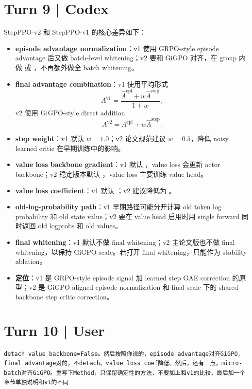 \documentclass[10pt]{ctexart}
\begin{document}
\section*{Turn 9 | Codex}
StepPPO-v2 和 StepPPO-v1 的核心差异如下：
\begin{itemize}
\item \textbf{episode advantage normalization}：v1 使用 GRPO-style episode advantage 后又做 batch-level whitening；v2 要和 GiGPO 对齐，在  group 内做  或 ，不再额外做全 batch whitening。
\item \textbf{final advantage combination}：v1 使用平均形式
\[
A^{\mathrm{v1}}=\frac{\widehat A^{\mathrm{epi}}+w\widehat A^{\mathrm{step}}}{1+w},
\]
v2 使用 GiGPO-style direct addition
\[
A^{\mathrm{v2}}=A^{\mathrm{epi}}+w\widehat A^{\mathrm{step}}.
\]
\item \textbf{step weight}：v1 默认 $w=1.0$；v2 论文规范建议 $w=0.5$，降低 noisy learned critic 在早期训练中的影响。
\item \textbf{value loss backbone gradient}：v1 默认 ，value loss 会更新 actor backbone；v2 稳定版本默认 ，value loss 主要训练 value head。
\item \textbf{value loss coefficient}：v1 默认 ；v2 建议降低为 。
\item \textbf{old-log-probability path}：v1 早期路径可能分开计算 old token log probability 和 old state value；v2 要在 value head 启用时用 single forward 同时返回 old logprobs 和 old values。
\item \textbf{final whitening}：v1 默认不做 final whitening；v2 主论文版也不做 final whitening，以保持 GiGPO scale。若打开 final whitening，只能作为 stability ablation。
\item \textbf{定位}：v1 是 GRPO-style episode signal 加 learned step GAE correction 的原型；v2 是 GiGPO-aligned episode normalization 和 final scale 下的 shared-backbone step critic correction。
\end{itemize}

\section*{Turn 10 | User}
\begin{Verbatim}[breaklines=true,breakanywhere=true]
detach_value_backbone=False。然后按照你说的，episode advantage对齐GiGPO，final advantage对的。不detach。value loss coef降低。然后，还有一点，micro-batch对齐GiGPO。重写下Method，只保留确定性的方法，不要加上和v1的比较，最后加一个章节单独说明和v1的不同
\end{Verbatim}
\end{document}

